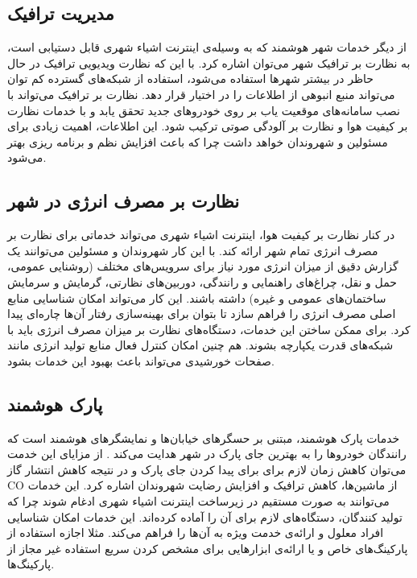     \subsection{مدیریت ترافیک}
      از دیگر خدمات شهر هوشمند که به وسیله‌ی اینترنت اشیاء شهری قابل دستیابی است، به نظارت بر ترافیک شهر می‌توان اشاره کرد.
      با این که نظارت ویدیویی ترافیک در حال حاظر در بیشتر شهر‌ها استفاده می‌شود، استفاده از شبکه‌های گسترده کم توان می‌تواند منبع انبوهی از اطلاعات را در اختیار قرار دهد.
      نظارت بر ترافیک می‌تواند با نصب سامانه‌های موقعیت یاب بر روی خودرو‌های جدید تحقق یابد \cite{li2008performance} و با خدمات نظارت بر کیفیت هوا و نظارت بر آلودگی صوتی ترکیب شود.
      این اطلاعات، اهمیت زیادی برای مسئولین و شهروندان خواهد داشت چرا که باعث افزایش نظم و برنامه ریزی بهتر می‌شود.

    \subsection{نظارت بر مصرف انرژی در شهر}
      در کنار نظارت بر کیفیت هوا، اینترنت اشیاء شهری می‌تواند خدماتی برای نظارت بر مصرف انرژی تمام شهر ارائه کند.
      با این کار شهروندان و مسئولین می‌توانند یک گزارش دقیق از میزان انرژی مورد نیاز برای سرویس‌های مختلف (روشنایی عمومی، حمل و نقل، چراغ‌های راهنمایی و رانندگی، دوربین‌های نظارتی، گرمایش و سرمایش ساختمان‌های عمومی و غیره) داشته باشند.
      این کار می‌تواند امکان شناسایی منابع اصلی مصرف انرژی را فراهم سازد تا بتوان برای بهینه‌سازی رفتار آن‌ها چاره‌ای پیدا کرد.
      برای ممکن ساختن این خدمات، دستگاه‌های نظارت بر میزان مصرف انرژی باید با شبکه‌های قدرت یکپارچه بشوند.
      هم چنین امکان کنترل فعال منابع تولید انرژی مانند صفحات خورشیدی می‌تواند باعث بهبود این خدمات بشود.

    \subsection{پارک هوشمند}
      خدمات پارک هوشمند، مبتنی بر حسگر‌های خیابان‌ها و نمایشگر‌های هوشمند است که رانندگان خودرو‌ها را به بهترین جای پارک در شهر هدایت می‌کند \cite{lee2008intelligent}.
      از مزایای این خدمت می‌توان کاهش زمان لازم برای برای پیدا کردن جای پارک و در نتیجه کاهش انتشار گاز CO از ماشین‌ها، کاهش ترافیک و افزایش رضایت شهروندان اشاره کرد.
      این خدمات می‌توانند به صورت مستقیم در زیرساخت اینترنت اشیاء شهری ادغام شوند چرا که تولید کنندگان، دستگاه‌های لازم برای آن را آماده کرده‌اند.
      این خدمات امکان شناسایی افراد معلول و ارائه‌ی خدمت ویژه به آن‌ها را فراهم می‌کند.
      مثلا اجازه استفاده از پارکینگ‌های خاص و یا ارائه‌ی ابزار‌هایی برای مشخص کردن سریع استفاده غیر مجاز از پارکینگ‌ها.

